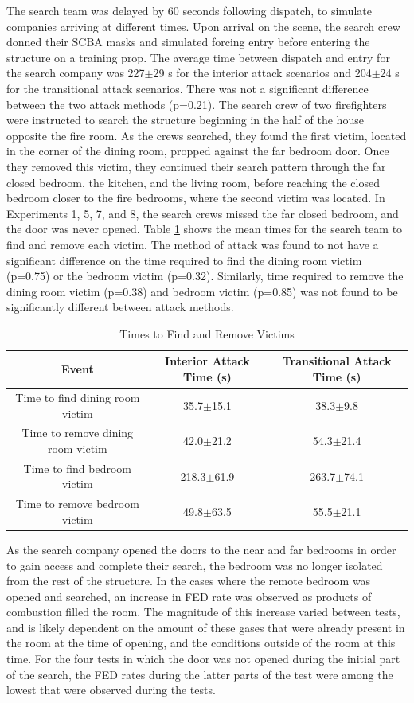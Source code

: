 \documentclass[12pt,oneside]{article}
\begin{document}
The search team was delayed by 60 seconds following dispatch, to simulate companies arriving at different times. Upon arrival on the scene, the search crew donned their SCBA masks and simulated forcing entry before entering the structure on a training prop. The average time between dispatch and entry for the search company was 227$\pm$29 s for the interior attack scenarios and 204$\pm$24 s for the transitional attack scenarios. There was not a significant difference between the two attack methods (p=0.21). The search crew of two firefighters were instructed to search the structure beginning in the half of the house opposite the fire room. As the crews searched, they found the first victim, located in the corner of the dining room, propped against the far bedroom door. Once they removed this victim, they continued their search pattern through the far closed bedroom, the kitchen, and the living room, before reaching the closed bedroom closer to the fire bedrooms, where the second victim was located. In Experiments 1, 5, 7, and 8, the search crews missed the far closed bedroom, and the door was never opened. Table \ref{tab:victim_times} shows the mean times for the search team to find and remove each victim. The method of attack was found to not have a significant difference on the time required to find the dining room victim (p=0.75) or the bedroom victim (p=0.32). Similarly, time required to remove the dining room victim (p=0.38) and bedroom victim (p=0.85) was not found to be significantly different between attack methods. 

\begin{table}[!ht]
    \centering
    \caption{Times to Find and Remove Victims}
    \label{tab:victim_times}
    \begin{tabular}{ccc}
    \toprule[1.5pt]
 	 Event&								Interior Attack Time (s)&	Transitional Attack Time (s)\\
 	\midrule 
  	Time to find dining room victim&	35.7$\pm$15.1&				38.3$\pm$9.8\\
  	Time to remove dining room victim&	42.0$\pm$21.2&				54.3$\pm$21.4\\
  	Time to find bedroom victim&		218.3$\pm$61.9&				263.7$\pm$74.1\\
  	Time to remove bedroom victim&		49.8$\pm$63.5&				55.5$\pm$21.1\\
 	\bottomrule[1.25pt] 
    \end{tabular}
\end{table}

As the search company opened the doors to the near and far bedrooms in order to gain access and complete their search, the bedroom was no longer isolated from the rest of the structure. In the cases where the remote bedroom was opened and searched, an increase in FED rate was observed as products of combustion filled the room. The magnitude of this increase varied between tests, and is likely dependent on the amount of these gases that were already present in the room at the time of opening, and the conditions outside of the room at this time.  For the four tests in which the door was not opened during the initial part of the search, the FED rates during the latter parts of the test were among the lowest that were observed during the tests. 
\end{document}
